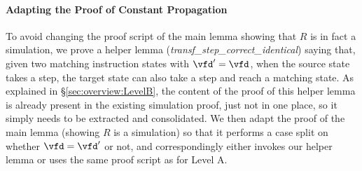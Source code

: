 \paragraph{Adapting the Proof of Constant Propagation}

To avoid changing the proof script of the main lemma showing that $R$
is in fact a simulation, we prove a helper lemma
(\textit{transf\_step\_correct\_identical}) saying that, given two
matching instruction states with $\vfd'=\vfd$, when the source state
takes a step, the target state can also take a step and reach a
matching state.  As explained in \S\ref{sec:overview:LevelB}, the
content of the proof of this helper lemma is already present in the
existing simulation proof, just not in one place, so it simply needs
to be extracted and consolidated.  We then adapt the proof of the main
lemma (showing $R$ is a simulation) so that it performs a case split on
whether $\vfd=\vfd'$ or not, and correspondingly either invokes our
helper lemma or uses the same proof script as for Level A.


